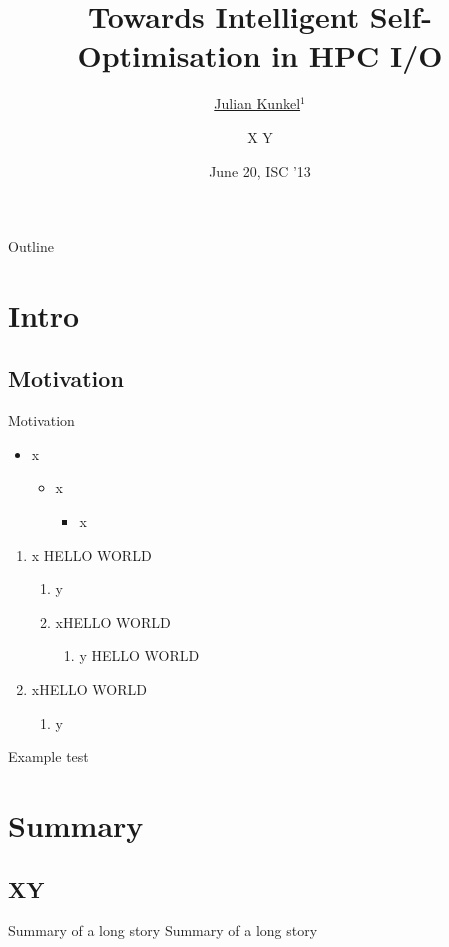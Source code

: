 \documentclass[compress,11pt,xcolor=svgnames,aspectratio=43]{beamer}
\title[Self-Optimisation in HPC I/O]{Towards Intelligent Self-Optimisation in HPC I/O}
\author[Julian Kunkel]{\underline {Julian Kunkel}$^1$ \and X Y
}
\institute[Univ. of Hamburg]{1 University of Hamburg\\ 2 ZIH Dresden}
\date{June 20, ISC '13}
\begin{document}
\begin{frame}[plain]
	\titlepage
\end{frame}

\begin{withoutheadline}
\begin{frame}{Outline}
	\begin{centering}
	\tableofcontents[hideallsubsections]
	\end{centering}

	\disclaimer
\end{frame}
\end{withoutheadline}


\section{Intro}
\subsection{Motivation}

\begin{frame}{Motivation}

\begin{itemize}
	\item x
	\begin{itemize}
		\item x
		\begin{itemize}
			\item x
		\end{itemize}
	\end{itemize}
\end{itemize}

\begin{enumerate}
	\item x HELLO WORLD
	\begin{enumerate}
		\item y
		\item xHELLO WORLD
		\begin{enumerate}
			\item y HELLO WORLD
		\end{enumerate}
	\end{enumerate}
	\item xHELLO WORLD
	\begin{enumerate}
		\item y
	\end{enumerate}
\end{enumerate}

\begin{block}{Example}
test
\end{block}

\end{frame}

\section{Summary}
\subsection{XY}

\begin{frame}{Summary of a long story Summary of a long story}
\label{pg:lastframe}

\end{frame}

\appendix

\acknowledgement
\end{document}
